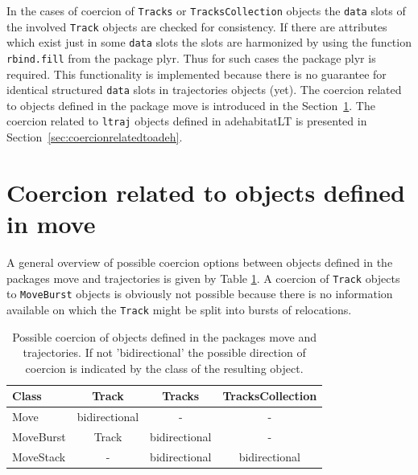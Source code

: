 \documentclass[12pt, oneside, a4paper]{scrbook}
\newcommand{\pkg}[1]{{\normalfont\fontseries{b}\selectfont #1}}
\let\code=\texttt
\newcommand{\codeintitles}[1]{{\tt #1}} %
\begin{document}
In the cases of coercion of \code{Tracks} or \code{TracksCollection} objects the \code{data} slots of the involved \code{Track} objects are checked for consistency. If there are attributes which exist just in some \code{data} slots the slots are harmonized by using the function \code{rbind.fill} from the package \pkg{plyr}. 
Thus for such cases the package \pkg{plyr} is required. 
This functionality is implemented because there is no guarantee for identical structured \code{data} slots in \pkg{trajectories} objects (yet). The coercion related to objects defined in the package \pkg{move} is introduced in the Section~\ref{sec:coercionrelatedtomove}. The coercion related to \code{ltraj} objects defined in \pkg{adehabitatLT} is presented in Section~\ref{sec:coercionrelatedtoadeh}.
\par\medskip


\section{Coercion related to objects defined in \pkg{move}}
\label{sec:coercionrelatedtomove}

A general overview of possible coercion options between objects defined in the packages \pkg{move} and \pkg{trajectories} is given by Table \ref{tab:possiblecoercion}. A coercion of \code{Track} objects to \code{MoveBurst} objects is obviously not possible because there is no information available on which the \code{Track} might be split into bursts of relocations.
\par\medskip

\begin{table}[!htb]
\centering
\begin{tabular}{lccc}
\hline\hline
Class & Track & Tracks & TracksCollection\\
\hline
Move & bidirectional & - & -\\
MoveBurst & Track & bidirectional & -\\
MoveStack & - & bidirectional & bidirectional\\
\hline\hline
\end{tabular}
\caption[Coercion between \pkg{move} and \pkg{trajectories} objects]{Possible coercion of objects defined in the packages \pkg{move} and \pkg{trajectories}. If not 'bidirectional' the possible direction of coercion is indicated by the class of the resulting object.}
\label{tab:possiblecoercion}
\end{table}
\end{document}
